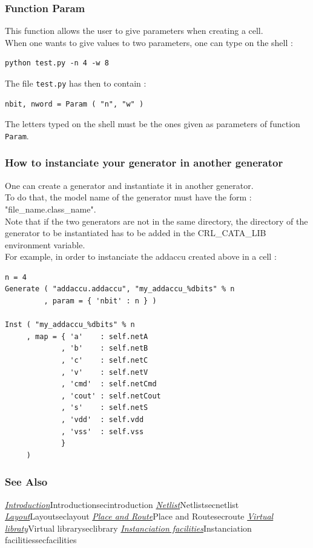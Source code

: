 \newpage
\subsubsection{Function Param}

This function allows the user to give parameters when creating a cell.\\
\indent When one wants to give values to two parameters, one can type on the shell :
\begin{verbatim}
python test.py -n 4 -w 8
\end{verbatim}
\indent The file \verb-test.py- has then to contain :
\begin{verbatim}
nbit, nword = Param ( "n", "w" )
\end{verbatim}
\indent The letters typed on the shell must be the ones given as parameters of function \verb-Param-.

\subsubsection{How to instanciate your generator in another generator}

One can create a generator and instantiate it in another generator.\\
\indent To do that, the model name of the generator must have the form : "file\_name.class\_name".\\    
\indent Note that if the two generators are not in the same directory, the directory of the generator to be instantiated has to be added in the CRL\_CATA\_LIB environment variable.\\

\indent For example, in order to instanciate the addaccu created above in a cell :
\begin{verbatim}
n = 4
Generate ( "addaccu.addaccu", "my_addaccu_%dbits" % n
         , param = { 'nbit' : n } )

Inst ( "my_addaccu_%dbits" % n
     , map = { 'a'    : self.netA
             , 'b'    : self.netB
             , 'c'    : self.netC
             , 'v'    : self.netV
             , 'cmd'  : self.netCmd
             , 'cout' : self.netCout
             , 's'    : self.netS
             , 'vdd'  : self.vdd
             , 'vss'  : self.vss
             }
     )
\end{verbatim}

\begin{htmlonly}

\subsubsection{See Also}

\hyperref[ref]{\emph{Introduction}}{}{Introduction}{secintroduction}
\hyperref[ref]{\emph{Netlist}}{}{Netlist}{secnetlist}
\hyperref[ref]{\emph{Layout}}{}{Layout}{seclayout}
\hyperref[ref]{\emph{Place and Route}}{}{Place and Route}{secroute}
\hyperref[ref]{\emph{Virtual libraty}}{}{Virtual library}{seclibrary}
\hyperref[ref]{\emph{Instanciation facilities}}{}{Instanciation facilities}{secfacilities}

\end{htmlonly}
